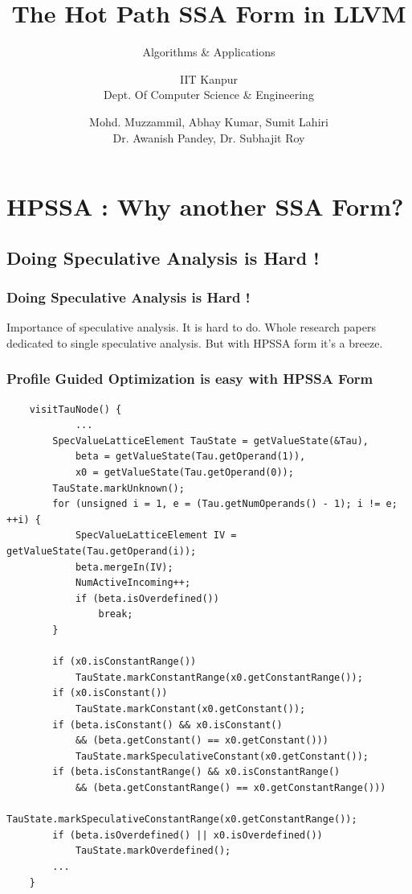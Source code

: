 \documentclass[aspectratio=169]{beamer}
\title[\url{https://google.com}] %
{The Hot Path SSA Form in LLVM}
\subtitle{Algorithms \& Applications}
\author[VIP1 \& VIP2] %
{IIT Kanpur \\ Dept. Of Computer Science \& Engineering}
\institute[IDK] %
{
	\inst{1}%
	IIT Kanpur\\
	PRAISE Group
}
\date[01/03/2022] %
{Mohd. Muzzammil, Abhay Kumar, Sumit Lahiri \\ Dr. Awanish Pandey, Dr. Subhajit Roy}
\begin{document}
\frame{\titlepage}

\footnotesize
\section{HPSSA : Why another SSA Form?}
\subsection{Doing Speculative Analysis is Hard !}
\begin{frame}
	\frametitle{Doing Speculative Analysis is Hard !}
	Importance of speculative analysis. It is hard to do. Whole research papers dedicated to 
	single speculative analysis. But with HPSSA form it's a breeze.
\end{frame}
{
	
}
\begin{frame}[fragile]
	\frametitle{Profile Guided Optimization is easy with HPSSA Form}
	\begin{verbatim}
	visitTauNode() {
			...
		SpecValueLatticeElement TauState = getValueState(&Tau), 
			beta = getValueState(Tau.getOperand(1)), 
			x0 = getValueState(Tau.getOperand(0));
		TauState.markUnknown();
		for (unsigned i = 1, e = (Tau.getNumOperands() - 1); i != e; ++i) {
			SpecValueLatticeElement IV = getValueState(Tau.getOperand(i));
			beta.mergeIn(IV);
			NumActiveIncoming++;
			if (beta.isOverdefined())
				break;
		}

		if (x0.isConstantRange())
			TauState.markConstantRange(x0.getConstantRange());
		if (x0.isConstant()) 
  			TauState.markConstant(x0.getConstant());
		if (beta.isConstant() && x0.isConstant() 
  			&& (beta.getConstant() == x0.getConstant()))
  			TauState.markSpeculativeConstant(x0.getConstant());
		if (beta.isConstantRange() && x0.isConstantRange() 
  			&& (beta.getConstantRange() == x0.getConstantRange()))
  			TauState.markSpeculativeConstantRange(x0.getConstantRange());
		if (beta.isOverdefined() || x0.isOverdefined())
  			TauState.markOverdefined();
		...
	}
	\end{verbatim}
\end{frame}
\end{document}
